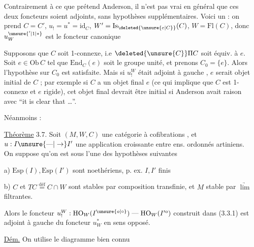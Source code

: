 Contrairement à ce que prétend Anderson,
il n'est pas vrai en général que ces
deux foncteurs soient adjoints, sans hypothèses
supplémentaires. Voici un
 : on prend $C=C'$, $u_!=u^*=\mathrm{id}_C$,
$W'=\mathrm{Is}_{\deleted{\unsure{e|C}}}(C)$, $W=\mathrm{Fl}(C)$, donc  $u_W^{\unsure{'|1|*}}$ est
le foncteur canonique


Supposons que $C$ soit 1-connexe,  i.e
$\deleted{\unsure{C}}\Pi C$ soit équiv. à $e$. Soit $e\in\mathrm{Ob}\,C$
tel que  $\mathrm{End}_C(e)$ soit le groupe unité,
  et
prenons $C_0=\{e\}$. Alors l'hypothèse
sur $C_0$ est satisfaite. Mais si $u_!^W$
était adjoint à gauche , $e$ serait objet
initial de $C$ ; 
par exemple si $C$ a un objet final $e$
(ce qui implique que $C$ est 1-connexe et
$e$ rigide), cet objet final devrait
être initial si Anderson avait raison avec
``it is clear that \ldots''.

Néanmoins :

\uline{Théorème} 3.7. Soit $(M,W,C)$ une catégorie à
cofibrations , et $u:I\unsure{\text{---}|\to}I'$ une application
croissante entre ens. ordonnés artiniens.
On suppose qu'on est sous l'une des
hypothèses suivantes

a) $\mathrm{Esp}(I),\mathrm{Esp}(I')$ sont noethériens, p. ex.
$I,I'$ finis

b) $C$ et $TC\overset{\mathrm{déf}}{=}C\cap W$ sont stables par composition
transfinie, et $M$ stable par  $\underrightarrow{\lim}$ filtrantes.

Alors le foncteur $u_!^W:\mathrm{HO}_W(I^{\unsure{o|\circ}})\mathrel{\text{---}}\mathrm{HO}_W(I'^o)$
construit dans (3.3.1) est adjoint à gauche
du foncteur $u_W^*$ en sens opposé.

\uline{Dém.} On utilise le diagramme bien
connu

